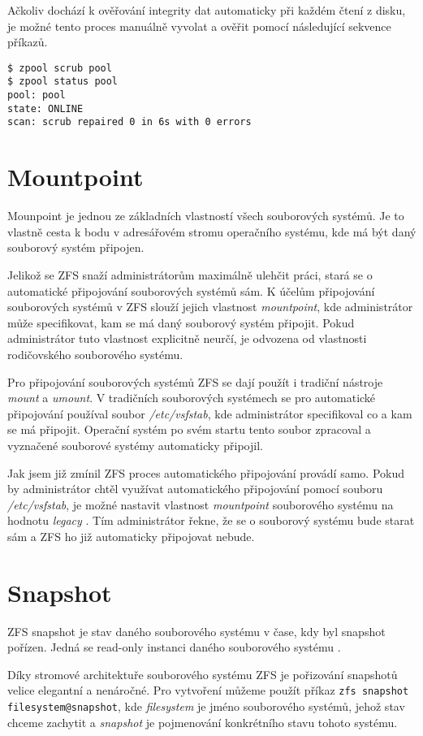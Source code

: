 Ačkoliv dochází k ověřování integrity dat automaticky při každém čtení z disku, je možné tento proces manuálně vyvolat a ověřit pomocí následující sekvence příkazů.
\begin{verbatim}
$ zpool scrub pool
$ zpool status pool
pool: pool
state: ONLINE
scan: scrub repaired 0 in 6s with 0 errors
\end{verbatim}

\section{Mountpoint}
\label{mountpoint}
Mounpoint je jednou ze základních vlastností všech souborových systémů. Je to vlastně cesta k bodu v adresářovém stromu operačního systému, kde má být daný souborový systém připojen.

Jelikož se ZFS snaží administrátorům maximálně ulehčit práci, stará se o automatické připojování souborových systémů sám. K účelům připojování souborových systémů v ZFS slouží jejich vlastnost \emph{mountpoint}, kde administrátor může specifikovat, kam se má daný souborový systém připojit. Pokud administrátor tuto vlastnost explicitně neurčí, je odvozena od vlastnosti rodičovského souborového systému.

Pro připojování souborových systémů ZFS se dají použít i tradiční nástroje \emph{mount} a \emph{umount}. V tradičních souborových systémech se pro automatické připojování používal soubor \emph{/etc/vsfstab}, kde administrátor specifikoval co a kam se má připojit. Operační systém po svém startu tento soubor zpracoval a vyznačené souborové systémy automaticky připojil.

Jak jsem již zmínil ZFS proces automatického připojování provádí samo. Pokud by administrátor chtěl využívat automatického připojování pomocí souboru \emph{/etc/vsfstab}, je možné nastavit vlastnost \emph{mountpoint} souborového systému na hodnotu \emph{legacy} \cite{mountpoint}. Tím administrátor řekne, že se o souborový systému bude starat sám a ZFS ho již automaticky připojovat nebude.
\section{Snapshot}
\label{snapshot}
ZFS snapshot je stav daného souborového systému v čase, kdy byl snapshot pořízen. Jedná se read-only instanci daného souborového systému \cite{snapshot}.

Díky stromové architektuře souborového systému ZFS je pořizování snapshotů velice elegantní a nenáročné. Pro vytvoření můžeme použít příkaz \verb|zfs snapshot filesystem@snapshot|, kde \emph{filesystem} je jméno souborového systémů, jehož stav chceme zachytit a \emph{snapshot} je pojmenování konkrétního stavu tohoto systému.

